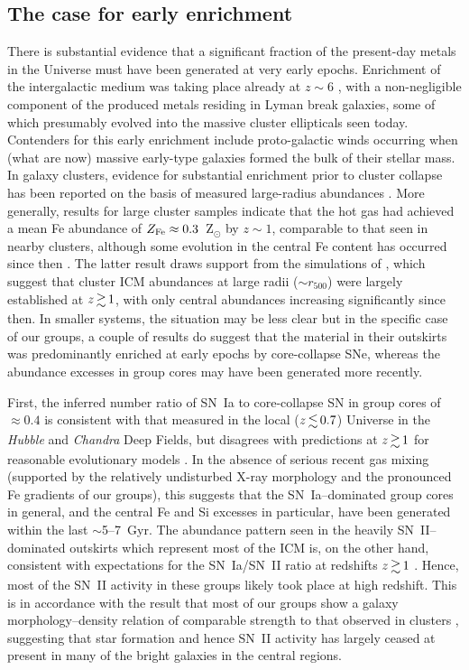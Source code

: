 \documentclass[useAMS,usenatbib]{mn2e}
\begin{document}
\subsection{The case for early enrichment}


There is substantial evidence that a significant fraction of the
present-day metals in the Universe must have been generated at very
early epochs. Enrichment of the intergalactic medium was taking place
already at $z\sim 6$ \citep{simc06}, with a non-negligible component
of the produced metals residing in Lyman break galaxies, some of which
presumably evolved into the massive cluster ellipticals seen today.
Contenders for this early enrichment include proto-galactic winds
occurring when (what are now) massive early-type galaxies formed the
bulk of their stellar mass. In galaxy clusters, evidence for
substantial enrichment prior to cluster collapse has been reported on
the basis of measured large-radius abundances \citep{fuji08}. More
generally, results for large cluster samples indicate that the hot gas
had achieved a mean Fe abundance of $Z_{\rm Fe} \approx 0.3$~Z$_\odot$
by $z\sim 1$, comparable to that seen in nearby clusters, although
some evolution in the central Fe content has occurred since then
\citep{bale07,maug08}.  The latter result draws support from the
simulations of \citet{cora08}, which suggest that cluster ICM
abundances at large radii ($\sim r_{500}$) were largely established at
$z\ga 1$, with only central abundances increasing significantly since
then. In smaller systems, the situation may be less clear
\citep{fino02} but in the specific case of our groups, a couple of
results do suggest that the material in their outskirts was
predominantly enriched at early epochs by core-collapse SNe, whereas
the abundance excesses in group cores may have been generated more
recently.

First, the inferred number ratio of SN~Ia to core-collapse SN in group
cores of $\approx 0.4$ is consistent with that measured in the local
($z\la 0.7$) Universe in the {\em Hubble} and {\em Chandra} Deep
Fields, but disagrees with predictions at $z\ga 1$ for reasonable
evolutionary models \citep{dahl04}. In the absence of serious recent
gas mixing (supported by the relatively undisturbed X-ray morphology
and the pronounced Fe gradients of our groups), this suggests that the
SN~Ia--dominated group cores in general, and the central Fe and Si
excesses in particular, have been generated within the last $\sim
$5--7~Gyr. The abundance pattern seen in the heavily SN~II--dominated
outskirts which represent most of the ICM is, on the other hand,
consistent with expectations for the SN~Ia/SN~II ratio at redshifts
$z\ga 1$ \citep{dahl04}. Hence, most of the SN~II activity in these
groups likely took place at high redshift.  This is in accordance with
the result that most of our groups show a galaxy morphology--density
relation of comparable strength to that observed in clusters
\citep{hels03}, suggesting that star formation and hence SN~II
activity has largely ceased at present in many of the bright galaxies
in the central regions.
\end{document}
